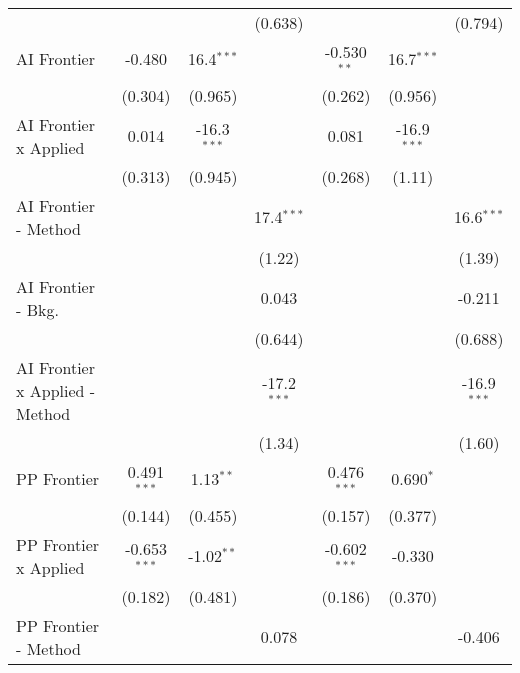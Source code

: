 \begin{tabular}{lcccccc}
                                  &                &               & (0.638)       &                &               & (0.794)\\   
   AI Frontier                    & -0.480         & 16.4$^{***}$  &               & -0.530$^{**}$  & 16.7$^{***}$  &   \\   
                                  & (0.304)        & (0.965)       &               & (0.262)        & (0.956)       &   \\   
   AI Frontier x Applied          & 0.014          & -16.3$^{***}$ &               & 0.081          & -16.9$^{***}$ &   \\   
                                  & (0.313)        & (0.945)       &               & (0.268)        & (1.11)        &   \\   
   AI Frontier - Method           &                &               & 17.4$^{***}$  &                &               & 16.6$^{***}$\\   
                                  &                &               & (1.22)        &                &               & (1.39)\\   
   AI Frontier - Bkg.             &                &               & 0.043         &                &               & -0.211\\   
                                  &                &               & (0.644)       &                &               & (0.688)\\   
   AI Frontier x Applied - Method &                &               & -17.2$^{***}$ &                &               & -16.9$^{***}$\\   
                                  &                &               & (1.34)        &                &               & (1.60)\\   
   PP Frontier                    & 0.491$^{***}$  & 1.13$^{**}$   &               & 0.476$^{***}$  & 0.690$^{*}$   &   \\   
                                  & (0.144)        & (0.455)       &               & (0.157)        & (0.377)       &   \\   
   PP Frontier x Applied          & -0.653$^{***}$ & -1.02$^{**}$  &               & -0.602$^{***}$ & -0.330        &   \\   
                                  & (0.182)        & (0.481)       &               & (0.186)        & (0.370)       &   \\   
   PP Frontier - Method           &                &               & 0.078         &                &               & -0.406\\   

\end{tabular}
